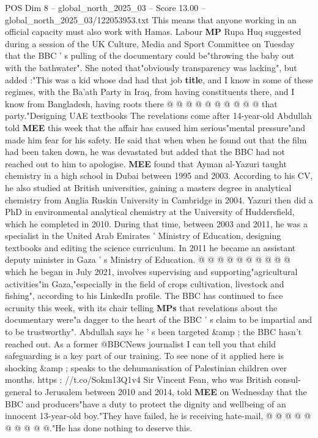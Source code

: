 \begin{textsample}{POS Dim 8 – global\_north\_2025\_03 – Score 13.00 – global\_north\_2025\_03/122053953.txt}
This means that anyone working in an official capacity must also work with Hamas.
Labour \textbf{MP} Rupa Huq suggested during a session of the UK Culture, Media and Sport Committee on Tuesday that the BBC ' s pulling of the documentary could be"throwing the baby out with the bathwater".
She noted that"obviously transparency was lacking", but added :"This was a kid whose dad had that job \textbf{title}, and I know in some of these regimes, with the Ba'ath Party in Iraq, from having constituents there, and I know from Bangladesh, having roots there @ @ @ @ @ @ @ @ @ @ that party."Designing UAE textbooks The revelations come after 14-year-old Abdullah told \textbf{MEE} this week that the affair has caused him serious"mental pressure"and made him fear for his safety.
He said that when when he found out that the film had been taken down, he was devastated but added that the BBC had not reached out to him to apologise. \textbf{MEE} found that Ayman al-Yazuri taught chemistry in a high school in Dubai between 1995 and 2003.
According to his CV, he also studied at British universities, gaining a masters degree in analytical chemistry from Anglia Ruskin University in Cambridge in 2004.
Yazuri then did a PhD in environmental analytical chemistry at the University of Huddersfield, which he completed in 2010.
During that time, between 2003 and 2011, he was a specialist in the United Arab Emirates ' Ministry of Education, designing textbooks and editing the science curriculum.
In 2011 he became an assistant deputy minister in Gaza ' s Ministry of Education. @ @ @ @ @ @ @ @ @ @ which he began in July 2021, involves supervising and supporting"agricultural activities"in Gaza,"especially in the field of crops cultivation, livestock and fishing", according to his LinkedIn profile.
The BBC has continued to face scrunity this week, with its chair telling \textbf{MPs} that revelations about the documentary were"a dagger to the heart of the BBC ' s claim to be impartial and to be trustworthy".
Abdullah says he ' s been targeted \&amp ; the BBC hasn't reached out.
As a former @BBCNews journalist I can tell you that child safeguarding is a key part of our training.
To see none of it applied here is shocking \&amp ; speaks to the dehumanisation of Palestinian children over months. https : //t.co/Sokm13Q1v4 Sir Vincent Fean, who was British consul-general to Jerusalem between 2010 and 2014, told \textbf{MEE} on Wednesday that the BBC and producers"have a duty to protect the dignity and wellbeing of an innocent 13-year-old boy."They have failed, he is receiving hate-mail, @ @ @ @ @ @ @ @ @ @."He has done nothing to deserve this.

\end{textsample}
